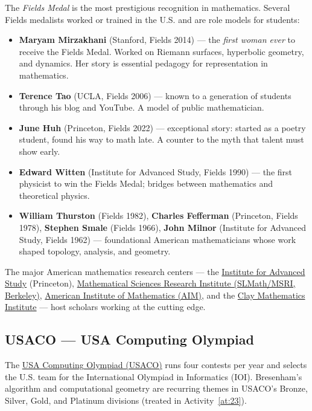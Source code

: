 \documentclass[12pt,a4paper]{scrartcl}
\newcommand{\acc}[1]{\textcolor{accent}{\textbf{#1}}}
\begin{document}
The \emph{Fields Medal} is the most prestigious recognition in mathematics. Several Fields medalists worked or trained in the U.S. and are role models for students:

\begin{itemize}[leftmargin=1.3em,itemsep=0.15em,topsep=0.3em]
  \item \acc{Maryam Mirzakhani} (Stanford, Fields 2014) --- the \emph{first woman ever} to receive the Fields Medal. Worked on Riemann surfaces, hyperbolic geometry, and dynamics. Her story is essential pedagogy for representation in mathematics.
  \item \acc{Terence Tao} (UCLA, Fields 2006) --- known to a generation of students through his blog and YouTube. A model of public mathematician.
  \item \acc{June Huh} (Princeton, Fields 2022) --- exceptional story: started as a poetry student, found his way to math late. A counter to the myth that talent must show early.
  \item \acc{Edward Witten} (Institute for Advanced Study, Fields 1990) --- the first physicist to win the Fields Medal; bridges between mathematics and theoretical physics.
  \item \acc{William Thurston} (Fields 1982), \acc{Charles Fefferman} (Princeton, Fields 1978), \acc{Stephen Smale} (Fields 1966), \acc{John Milnor} (Institute for Advanced Study, Fields 1962) --- foundational American mathematicians whose work shaped topology, analysis, and geometry.
\end{itemize}

The major American mathematics research centers --- the \href{https://www.ias.edu/}{Institute for Advanced Study} (Princeton), \href{https://www.slmath.org/}{Mathematical Sciences Research Institute (SLMath/MSRI, Berkeley)}, \href{https://www.aimath.org/}{American Institute of Mathematics (AIM)}, and the \href{https://www.claymath.org/}{Clay Mathematics Institute} --- host scholars working at the cutting edge.

\subsection{USACO --- USA Computing Olympiad}

The \href{http://usaco.org/}{USA Computing Olympiad (USACO)} runs four contests per year and selects the U.S. team for the International Olympiad in Informatics (IOI). Bresenham's algorithm and computational geometry are recurring themes in USACO's Bronze, Silver, Gold, and Platinum divisions (treated in Activity~\ref{at:23}).
\end{document}
